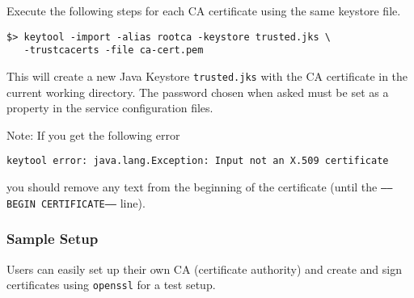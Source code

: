 \documentclass[a4paper,10pt]{book}
\begin{document}
Execute the following steps for each CA certificate using the same keystore file.


\begin{verbatim}
$> keytool -import -alias rootca -keystore trusted.jks \
   -trustcacerts -file ca-cert.pem
\end{verbatim}


This will create a new Java Keystore \texttt{trusted.jks} with the CA certificate in the current working directory. The password chosen when asked must be set as a property in the service configuration files.

Note: If you get the following error
\begin{verbatim}
keytool error: java.lang.Exception: Input not an X.509 certificate
\end{verbatim}
you should remove any text from the beginning of the certificate (until the \texttt{-----BEGIN CERTIFICATE-----} line).


\subsubsection{Sample Setup}

Users can easily set up their own CA (certificate authority) and create and sign certificates using \texttt{openssl} for a test setup.
\end{document}
